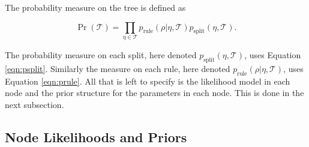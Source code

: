 \documentclass{article}
\begin{document}
 The probability measure on the tree is defined as 
 
 \begin{equation}
 \Pr(\mathcal{T}) = \prod_{\eta \in \mathcal{T}} p_{\text{rule}}(\rho \vert \eta, \mathcal{T})p_{\text{split}}(\eta, \mathcal{T}).
\end{equation}

The probability measure on each split, here denoted $p_{\text{split}}(\eta, \mathcal{T})$, uses Equation \ref{eqn:psplit}. Similarly the measure on each rule, here denoted $p_{\text{rule}}(\rho \vert \eta, \mathcal{T})$, uses Equation \ref{eqn:prule}. 
All that is left to specify is the likelihood model in each node and the prior structure for the parameters in each node. This is done in the next subsection. 

\subsection{Node Likelihoods and Priors}
\end{document}
